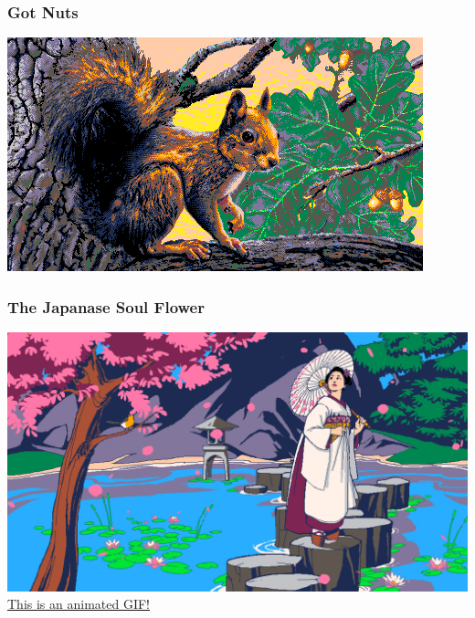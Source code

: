 \documentclass{beamer}
\begin{document}
\begin{frame}
  \frametitle{Got Nuts}
  \includegraphics[width=\textwidth]{got_nuts}
\end{frame}

\begin{frame}
  \frametitle{The Japanase Soul Flower}
  \includegraphics[width=.9\textwidth]{TheJapaneseSoulFlower_Final}\\
  \href{TheJapaneseSoulFlower_Final.gif}{This is an animated GIF!}
\end{frame}
\end{document}
